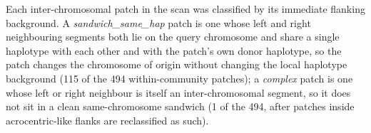 %
%

Each inter-chromosomal patch in the scan was classified by its immediate flanking
background. A \emph{sandwich\_same\_hap} patch is one whose left and right
neighbouring segments both lie on the query chromosome and share a single
haplotype with each other and with the patch's own donor haplotype, so the patch
changes the chromosome of origin without changing the local haplotype background
(115 of the 494 within-community patches); a \emph{complex} patch is one whose
left or right neighbour is itself an inter-chromosomal segment, so it does not
sit in a clean same-chromosome sandwich (1 of the 494, after patches inside
acrocentric-like flanks are reclassified as such).
